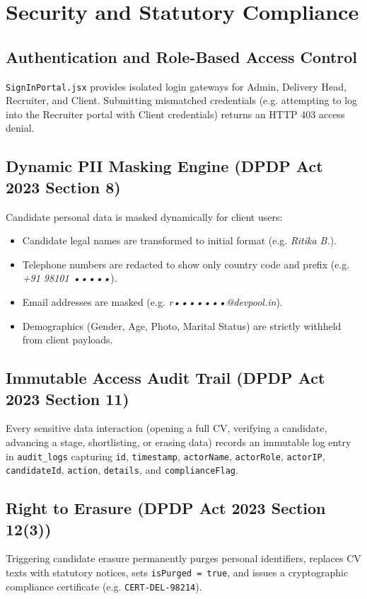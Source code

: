 \documentclass[11pt,a4paper,oneside]{report}
\begin{document}
\chapter{Security and Statutory Compliance}

\section{Authentication and Role-Based Access Control}
\texttt{SignInPortal.jsx} provides isolated login gateways for Admin, Delivery Head, Recruiter, and Client. Submitting mismatched credentials (e.g. attempting to log into the Recruiter portal with Client credentials) returns an HTTP 403 access denial.

\section{Dynamic PII Masking Engine (DPDP Act 2023 Section 8)}
Candidate personal data is masked dynamically for client users:
\begin{itemize}[leftmargin=1.5em]
    \item Candidate legal names are transformed to initial format (e.g. \textit{Ritika B.}).
    \item Telephone numbers are redacted to show only country code and prefix (e.g. \textit{+91 98101 •••••}).
    \item Email addresses are masked (e.g. \textit{r•••••••@devpool.in}).
    \item Demographics (Gender, Age, Photo, Marital Status) are strictly withheld from client payloads.
\end{itemize}

\section{Immutable Access Audit Trail (DPDP Act 2023 Section 11)}
Every sensitive data interaction (opening a full CV, verifying a candidate, advancing a stage, shortlisting, or erasing data) records an immutable log entry in \texttt{audit\_logs} capturing \texttt{id}, \texttt{timestamp}, \texttt{actorName}, \texttt{actorRole}, \texttt{actorIP}, \texttt{candidateId}, \texttt{action}, \texttt{details}, and \texttt{complianceFlag}.

\section{Right to Erasure (DPDP Act 2023 Section 12(3))}
Triggering candidate erasure permanently purges personal identifiers, replaces CV texts with statutory notices, sets \texttt{isPurged = true}, and issues a cryptographic compliance certificate (e.g. \texttt{CERT-DEL-98214}).
\end{document}

